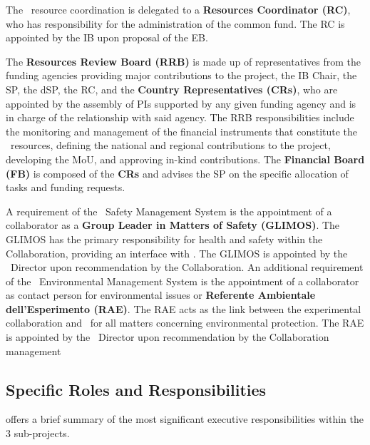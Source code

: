 The \DS\ resource coordination is delegated to a {\bf Resources Coordinator (RC)}, who has responsibility for the administration of the common fund.  The RC is appointed by the IB upon proposal of the EB.
  
The {\bf Resources Review Board (RRB)} is made up of representatives from the funding agencies providing major contributions to the project, the IB Chair, the SP, the dSP, the RC, and the {\bf Country Representatives (CRs)}, who are appointed by the assembly of PIs supported by any given funding agency and is in charge of the relationship with said agency. The RRB responsibilities include the monitoring and management of the financial instruments that constitute the \GADMC\ resources, defining the national and regional contributions to the project, developing the MoU, and approving in-kind contributions.  The {\bf Financial Board (FB)} is composed of the {\bf CRs} and advises the SP on the specific allocation of tasks and funding requests.

A requirement of the \LNGS\ Safety Management System is the appointment of a collaborator as a {\bf Group Leader in Matters of Safety (GLIMOS)}. The GLIMOS has the primary responsibility for health and safety within the Collaboration, providing an interface with \LNGS.  The GLIMOS is appointed by the \LNGS\ Director upon recommendation by the Collaboration.  An additional requirement of the \LNGS\ Environmental Management System is the appointment of a collaborator as contact person for environmental issues or {\bf Referente Ambientale dell'Esperimento (RAE)}.  The RAE acts as the link between the experimental collaboration and \LNGS\ for all matters concerning environmental protection.  The RAE is appointed by the \LNGS\ Director upon recommendation by the Collaboration management

\subsection{Specific Roles and Responsibilities}
\label{sec:Organization-RolesResponsibilities}

 offers a brief summary of the most significant executive responsibilities within the 3 sub-projects.


